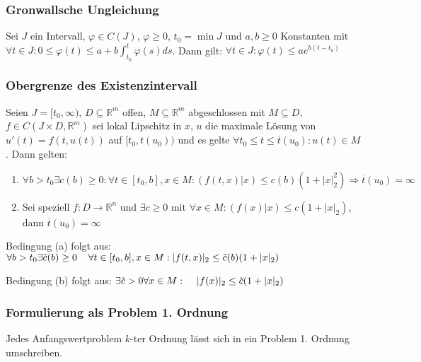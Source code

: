 \subsubsection*{Gronwallsche Ungleichung}

Sei $J$ ein Intervall, $\varphi \in C(J)$, $\varphi \geq 0$, $t_0 = \min J$ und $a, b \geq 0$ Konstanten mit $\forall t \in J : 0 \leq \varphi(t) \leq a+b \int_{t_0}^t \varphi(s) ds$. Dann gilt: $\forall t \in J : \varphi(t) \leq a e^{b(t-t_0)}$

\subsubsection*{Obergrenze des Existenzintervall}

Seien $J = [t_0, \infty)$, $D \subseteq \mathbb{R}^m$ offen, $M \subseteq \mathbb{R}^m$ abgeschlossen mit $M \subseteq D$, $f \in C(J \times D, \mathbb{R}^m)$ sei lokal Lipschitz in $x$, $u$ die maximale Lösung von $u'(t) = f(t, u(t))$ auf $[t_0, t(u_0))$ und es gelte $\forall t_0 \leq t \leq \overline t(u_0) : u(t) \in M$. Dann gelten:

\begin{enumerate}[label=(\alph*)]
	\item $\forall b > t_0 \exists c(b) \geq 0 : \forall t \in [t_0, b], x \in M : (f(t,x)|x) \leq c(b) (1+|x|_2^2) \Rightarrow \overline t(u_0) = \infty$
	\item Sei speziell $f: D \rightarrow \mathbb{R}^n$ und $\exists c \geq 0$ mit $\forall x \in M : (f(x)|x) \leq c(1+|x|_2)$, dann $\overline t(u_0) = \infty$
\end{enumerate}

Bedingung (a) folgt aus: $\forall b > t_0 \exists \tilde c(b) \geq 0 \\ \hspace*{4mm} \forall t \in [t_0, b], x \in M : |f(t,x)|_2 \leq \tilde c(b)(1+|x|_2)$

Bedingung (b) folgt aus: $\exists \tilde c > 0 \forall x \in M : \\ \hspace*{4mm} |f(x)|_2 \leq \tilde c(1+|x|_2)$

\subsubsection*{Formulierung als Problem 1. Ordnung}

Jedes Anfangswertproblem $k$-ter Ordnung lässt sich in ein Problem 1. Ordnung umschreiben.

